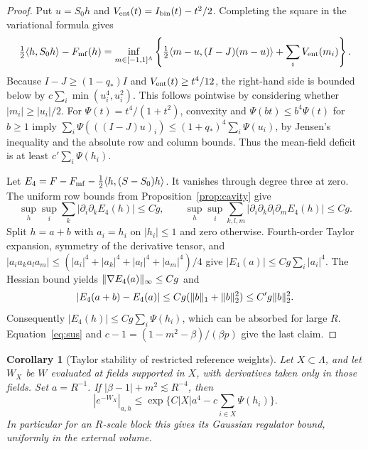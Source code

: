\documentclass[11pt]{article}
\newtheorem{corollary}[proposition]{Corollary}
\DeclarePairedDelimiter{\norm}{\lVert}{\rVert}
\begin{document}
\begin{proof}
Put \(u=S_0h\) and \(V_{\rm ent}(t)=I_{\rm bin}(t)-t^2/2\). Completing
the square in the variational formula gives
\[
 \tfrac12\langle h,S_0h\rangle-F_{\rm mf}(h)
 =\inf_{m\in[-1,1]^\Lambda}
  \left\{\tfrac12\langle m-u,(I-J)(m-u)\rangle
                     +\sum_i V_{\rm ent}(m_i)\right\}.
\]
Because \(I-J\ge(1-q_*)I\) and \(V_{\rm ent}(t)\ge t^4/12\),
the right-hand side is bounded below by
\(c\sum_i\min(u_i^4,u_i^2)\). This follows pointwise by considering
whether \(|m_i|\ge |u_i|/2\). For
\(\Psi(t)=t^4/(1+t^2)\), convexity and
\(\Psi(bt)\le b^4\Psi(t)\) for \(b\ge1\) imply
\(\sum_i\Psi(((I-J)u)_i)\le (1+q_*)^4\sum_i\Psi(u_i)\), by
Jensen's inequality and the absolute row and column bounds. Thus
the mean-field deficit is at least \(c'\sum_i\Psi(h_i)\).

Let \(E_4=F-F_{\rm mf}-\frac12\langle h,(S-S_0)h\rangle\).
It vanishes through degree three at zero. The uniform row bounds
from Proposition~\ref{prop:cavity} give
\[
 \sup_h\sup_i\sum_k|\partial_i\partial_kE_4(h)|\le Cg,
 \qquad
 \sup_h\sup_i\sum_{k,l,m}|\partial_i\partial_k\partial_l\partial_m
 E_4(h)|\le Cg.
\]
Split \(h=a+b\) with \(a_i=h_i\) on \(|h_i|\le1\) and zero otherwise.
Fourth-order Taylor expansion, symmetry of the derivative tensor, and
\(|a_i a_k a_l a_m|\le(|a_i|^4+|a_k|^4+|a_l|^4+|a_m|^4)/4\)
give \(|E_4(a)|\le Cg\sum_i|a_i|^4\).
The Hessian bound yields
\(\norm{\nabla E_4(a)}_\infty\le Cg\) and
\[
 |E_4(a+b)-E_4(a)|\le Cg(\norm b_1+\norm b_2^2)
                    \le C'g\norm b_2^2.
\]
Consequently \(|E_4(h)|\le Cg\sum_i\Psi(h_i)\), which
can be absorbed for large \(R\). Equation~\eqref{eq:sus} and
\(c-1=(1-m^2-\beta)/(\beta p)\) give the last claim.
\end{proof}


\begin{corollary}[Taylor stability of restricted reference weights]\label{cor:stablerestr}
Let \(X\subset\Lambda\), and let \(W_X\) be \(W\) evaluated at fields
supported in \(X\), with derivatives taken only in those fields.
Set \(a=R^{-1}\). If \(|\beta-1|+m^2\lesssim R^{-4}\), then
\[
 |e^{-W_X}|_{a,h}
 \le \exp\{C|X|a^4-c\textstyle\sum_{i\in X}\Psi(h_i)\}.
\]
In particular for an \(R\)-scale block this gives its Gaussian
regulator bound, uniformly in the external volume.
\end{corollary}
\end{document}
